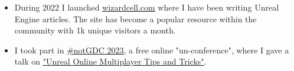 

\begin{cvparagraph}

\begin{itemize}[leftmargin=*]
  \item During 2022 I launched \href{https://wizardcell.com/}{\underline{wizardcell.com}} where I have been writing Unreal Engine articles. The site has become a popular resource within the community with 1k unique visitors a month.
  \item I took part in \href{https://notgdc.io/}{\underline{\#notGDC 2023}}, a free online "un-conference", where I gave a talk on \href{https://youtu.be/ja9lhOjgmqY}{\underline{"Unreal Online Multiplayer Tips and Tricks"}}.
\end{itemize}

\end{cvparagraph}